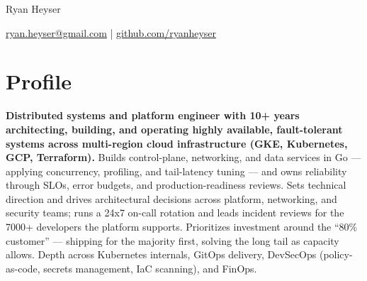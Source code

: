 \documentclass[11pt]{article}       %
\begin{document}
\centerline{\Huge Ryan Heyser}

\vspace{5pt}

\centerline{\href{mailto:ryan.heyser@gmail.com}{ryan.heyser@gmail.com} | \href{https://github.com/ryanheyser}{github.com/ryanheyser}}

\vspace{-18.5pt}

\section*{Profile}
\begin{description}
\item\textbf{Distributed systems and platform engineer with 10+ years architecting, building, and operating highly available, fault-tolerant systems across multi-region cloud infrastructure (GKE, Kubernetes, GCP, Terraform).} Builds control-plane, networking, and data services in Go — applying concurrency, profiling, and tail-latency tuning — and owns reliability through SLOs, error budgets, and production-readiness reviews. Sets technical direction and drives architectural decisions across platform, networking, and security teams; runs a 24x7 on-call rotation and leads incident reviews for the 7000+ developers the platform supports. Prioritizes investment around the ``80\% customer'' — shipping for the majority first, solving the long tail as capacity allows. Depth across Kubernetes internals, GitOps delivery, DevSecOps (policy-as-code, secrets management, IaC scanning), and FinOps. \\
\end{description}

\vspace{-18.5pt}

\end{document}
